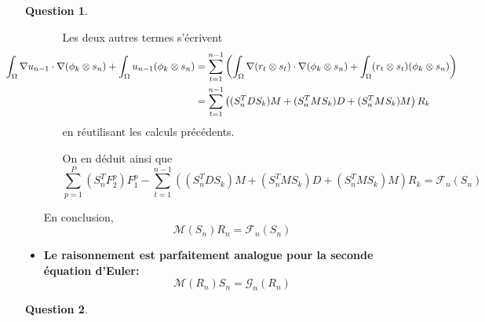 \documentclass[11pt]{article}
\theoremstyle{definition}
\newtheorem{ques}{Question}
\theoremstyle{plain}
\begin{document}
\begin{ques}
\begin{itemize}
\begin{itemize}
Les deux autres termes s'écrivent
\begin{align*}
\hspace*{-2cm}
\int_\Omega \nabla u_{n-1}\cdot \nabla(\phi_k\otimes s_n) + \int_\Omega u_{n-1}(\phi_k\otimes s_n)
&=
\sum_{t=1}^{n-1} \left(
\int_\Omega \nabla(r_t\otimes s_t)\cdot\nabla(\phi_k\otimes s_n) + \int_\Omega (r_t\otimes s_t)(\phi_k\otimes s_n)
\right) \\
& = \sum_{t=1}^{n-1} \left(
(S_n^TDS_k)M + (S_n^TMS_k)D + (S_n^TMS_k)M
\right)R_k
\end{align*}
en réutilisant les calculs précédents.

On en déduit ainsi que 
\[
\sum_{p=1}^P(S_n^TF_2^p)F_1^p - \sum_{t=1}^{n-1} \left(
(S_n^TDS_k)M + (S_n^TMS_k)D + (S_n^TMS_k)M
\right)R_k = \boxed{\mathcal{F}_n(S_n)}
\]
\end{itemize}

En conclusion, 
\[
\boxed{\mathcal{M}(S_n)R_n = \mathcal{F}_n(S_n)}
\]

\item \textbf{Le raisonnement est parfaitement analogue pour la seconde équation d'Euler:}
\[
\boxed{
\mathcal{M}(R_n)S_n = \mathcal{G}_n(R_n)
}
\]
\end{itemize}
\end{ques}

\begin{ques}

\end{ques}
\end{document}
